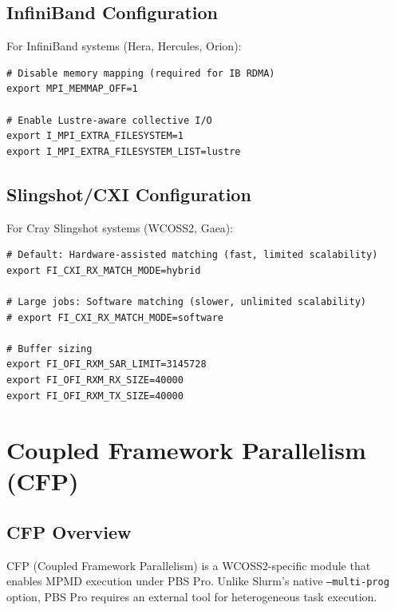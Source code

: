 \documentclass[11pt,a4paper,twoside]{article}
\begin{document}
\subsection{InfiniBand Configuration}

For InfiniBand systems (Hera, Hercules, Orion):

\begin{lstlisting}[style=bashstyle,caption={InfiniBand MPI Configuration},label={lst:ib}]
# Disable memory mapping (required for IB RDMA)
export MPI_MEMMAP_OFF=1

# Enable Lustre-aware collective I/O
export I_MPI_EXTRA_FILESYSTEM=1
export I_MPI_EXTRA_FILESYSTEM_LIST=lustre
\end{lstlisting}

\subsection{Slingshot/CXI Configuration}

For Cray Slingshot systems (WCOSS2, Gaea):

\begin{lstlisting}[style=bashstyle,caption={Slingshot CXI Configuration},label={lst:cxi}]
# Default: Hardware-assisted matching (fast, limited scalability)
export FI_CXI_RX_MATCH_MODE=hybrid

# Large jobs: Software matching (slower, unlimited scalability)
# export FI_CXI_RX_MATCH_MODE=software

# Buffer sizing
export FI_OFI_RXM_SAR_LIMIT=3145728
export FI_OFI_RXM_RX_SIZE=40000
export FI_OFI_RXM_TX_SIZE=40000
\end{lstlisting}

\section{Coupled Framework Parallelism (CFP)}
\label{sec:cfp}

\subsection{CFP Overview}

CFP (Coupled Framework Parallelism) is a WCOSS2-specific module that enables MPMD execution under PBS Pro. Unlike Slurm's native \texttt{--multi-prog} option, PBS Pro requires an external tool for heterogeneous task execution.
\end{document}
